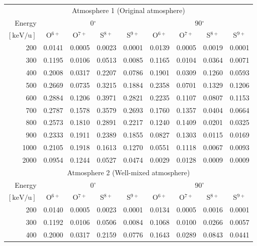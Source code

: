 \documentclass[draft]{agujournal2018}
\begin{document}
\begin{table}[ht]
    \centering
    \begin{tabular}{r|c|c|c|c|c|c|c|c}
    \multicolumn{9}{c}{Atmosphere 1 (Original atmosphere)} \\ \cline{2-9}
    Energy  & \multicolumn{4}{c|}{0$^\circ$} & \multicolumn{4}{c}{90$^\circ$} \\ \cline{2-9}
    $\mathrm{[keV/u]}$ & O$^{6+}$ & O$^{7+}$ & S$^{8+}$ & S$^{9+}$ & O$^{6+}$ & O$^{7+}$ & S$^{8+}$ & S$^{9+}$ \\ \cline{1-9}
    200      & 0.0141 & 0.0005 & 0.0023 & 0.0001 & 0.0139 & 0.0005 & 0.0019 & 0.0001 \\
    300      & 0.1195 & 0.0106 & 0.0513 & 0.0085 & 0.1165 & 0.0104 & 0.0364 & 0.0071 \\
    400      & 0.2008 & 0.0317 & 0.2207 & 0.0786 & 0.1901 & 0.0309 & 0.1260 & 0.0593 \\
    500      & 0.2669 & 0.0735 & 0.3215 & 0.1884 & 0.2358 & 0.0701 & 0.1329 & 0.1206 \\
    600      & 0.2884 & 0.1206 & 0.3971 & 0.2821 & 0.2235 & 0.1107 & 0.0807 & 0.1153 \\
    700      & 0.2787 & 0.1578 & 0.3579 & 0.2693 & 0.1760 & 0.1357 & 0.0404 & 0.0664 \\
    800      & 0.2573 & 0.1810 & 0.2891 & 0.2217 & 0.1240 & 0.1409 & 0.0201 & 0.0325 \\
    900      & 0.2333 & 0.1911 & 0.2389 & 0.1855 & 0.0827 & 0.1303 & 0.0115 & 0.0169 \\
    1000     & 0.2105 & 0.1918 & 0.1613 & 0.1270 & 0.0551 & 0.1118 & 0.0067 & 0.0093 \\
    2000     & 0.0954 & 0.1244 & 0.0527 & 0.0474 & 0.0029 & 0.0128 & 0.0009 & 0.0009 \\
    \hline
    \multicolumn{9}{c}{Atmosphere 2 (Well-mixed atmosphere)} \\ \cline{2-9}
    Energy  & \multicolumn{4}{c|}{0$^\circ$} & \multicolumn{4}{c}{90$^\circ$} \\ \cline{2-9}
    $\mathrm{[keV/u]}$ & O$^{6+}$ & O$^{7+}$ & S$^{8+}$ & S$^{9+}$ & O$^{6+}$ & O$^{7+}$ & S$^{8+}$ & S$^{9+}$ \\ \cline{1-9}
    200      & 0.0140 & 0.0005 & 0.0023 & 0.0001 & 0.0134 & 0.0005 & 0.0016 & 0.0001 \\
    300      & 0.1192 & 0.0106 & 0.0506 & 0.0084 & 0.1068 & 0.0100 & 0.0266 & 0.0057 \\
    400      & 0.2000 & 0.0317 & 0.2159 & 0.0776 & 0.1643 & 0.0289 & 0.0843 & 0.0441 \\

\end{tabular}
\end{table}
\end{document}

